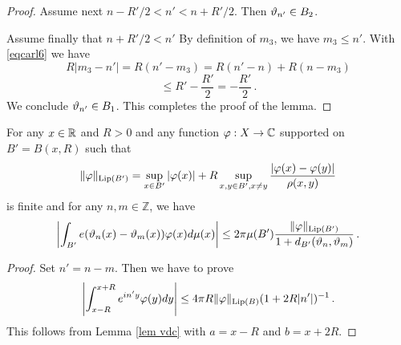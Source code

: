 {\begin{proof}
Assume next  $n-R'/2<n'<n+R'/2$. Then
$\vartheta_{n'}\in B_2$.

Assume finally that $n+R'/2<n'$
By definition of $m_3$,
we have $m_3\le n'$.  With \eqref{eqcarl6}
we have
\begin{equation*}
    R|m_3-n'|=R(n'-m_3)=R(n'-n)+R(n-m_3)
\end{equation*}
\begin{equation}
    \le R' -\frac{R'}2=-\frac{R'}2\, .
\end{equation}
We conclude $\vartheta_{n'}\in B_1$.
This completes the proof of the lemma.
\end{proof}


\begin{lemma}
    For any $x\in \mathbb{R}$ and $R>0$ and any
    function $\varphi: X\to \mathbb{C}$ supported on $B'=B(x,R)$
    such that
\begin{equation}
    \|\varphi\|_{\operatorname{\operatorname{Lip}}(B')} = \sup_{x \in B'} |\varphi(x)| + R \sup_{x,y \in B', x \neq y} \frac{|\varphi(x) - \varphi(y)|}{\rho(x,y)}
\end{equation}
is finite and for any $n,m\in \mathbb{Z}$, we have
\begin{equation}
    \label{eq vdc cond1}
    \left|\int_{B'} e(\vartheta_n(x)-{\vartheta_m(x)}) \varphi(x) d\mu(x)\right|\le 2\pi \mu(B')\frac{\|\varphi\|_{\operatorname{\operatorname{Lip}}(B')}}{1+d_{B'}(\vartheta_n,\vartheta_m)}
\, .
\end{equation}


\end{lemma}
\begin{proof}
Set $n'=n-m$. Then we have to prove
\begin{equation}
    \label{eq vdc cond2}
    \left|\int_{x-R}^{x+R} e^{in'y}\varphi(y) dy\right|\le 4\pi  R\|\varphi\|_{\operatorname{\operatorname{Lip}}(B)}
(1+2R|n'|)^{-1}\, .
\end{equation}
This follows from Lemma \ref{lem vdc} with $a = x - R$ and $b = x + 2R$.


\end{proof}}
